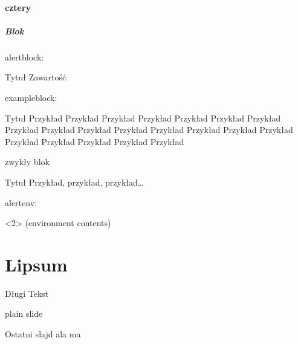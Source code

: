 \documentclass[lualatex,aspectratio=54,12pt,]{beamer}
\begin{document}
\subsection{cztery}

\begin{frame}
 \frametitle{Blok}
 alertblock:
 \begin{alertblock}{Tytuł}
  Zawartość
 \end{alertblock}

 exampleblock:
 \begin{exampleblock}{Tytuł}
  Przykład Przykład Przykład Przykład Przykład Przykład Przykład Przykład Przykład Przykład Przykład Przykład Przykład Przykład Przykład Przykład Przykład Przykład Przykład Przykład
 \end{exampleblock}

 zwykły blok
 \begin{block}{Tytuł}
 Przykład, przykład, przykład…
 \end{block}

 alertenv:
 \begin{alertenv}<2>
  (environment contents)
 \end{alertenv}
\end{frame}

\part{Lipsum}

\begin{frame}
\partpage
\end{frame}

\begin{frame}[allowframebreaks=0.97]{Długi Tekst}
 \lipsum
\end{frame}

\begin{frame}[plain,c]
plain slide
\end{frame}

\begin{frame}{Ostatni slajd}
ala ma 
\end{frame}
\end{document}
